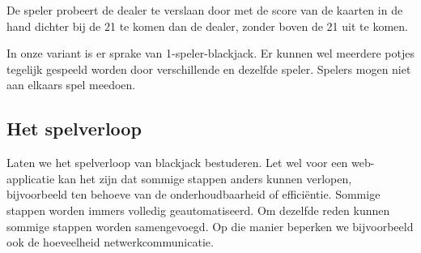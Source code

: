 De speler probeert de dealer te verslaan door met de score van de kaarten 
in de hand dichter bij de 21 te komen dan de dealer, 
zonder boven de 21 uit te komen.

In onze variant is er sprake van 1-speler-blackjack. Er kunnen wel 
meerdere potjes tegelijk gespeeld worden door verschillende en dezelfde 
speler. Spelers mogen niet aan elkaars spel meedoen.

\subsection*{Het spelverloop}
Laten we het spelverloop van blackjack bestuderen.
Let wel\: voor een web-applicatie kan het zijn dat sommige stappen
anders kunnen verlopen, bijvoorbeeld ten behoeve van de onderhoudbaarheid
of efficiëntie. Sommige stappen worden immers volledig geautomatiseerd. 
Om dezelfde reden kunnen sommige stappen worden samengevoegd. 
Op die manier beperken we bijvoorbeeld ook de hoeveelheid netwerkcommunicatie.

